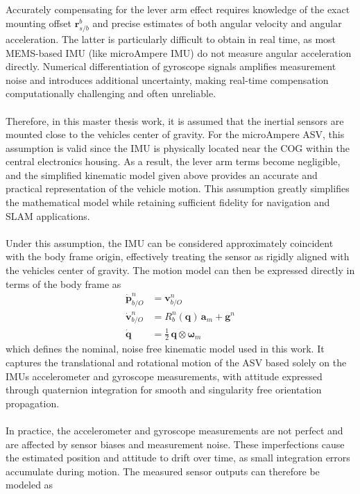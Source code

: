 \\ \\
Accurately compensating for the lever arm effect requires knowledge of the exact mounting offset $\mathbf{r}_{s/b}^{b}$ and precise estimates of both angular velocity and angular acceleration. The latter is particularly difficult to obtain in real time, as most MEMS-based IMU (like microAmpere IMU) do not measure angular acceleration directly. Numerical differentiation of gyroscope signals amplifies measurement noise and introduces additional uncertainty, making real-time compensation computationally challenging and often unreliable.  
\\ \\
Therefore, in this master thesis work, it is assumed that the inertial sensors are mounted close to the vehicles center of gravity. For the microAmpere ASV, this assumption is valid since the IMU is physically located near the COG within the central electronics housing. As a result, the lever arm terms become negligible, and the simplified kinematic model given above provides an accurate and practical representation of the vehicle motion. This assumption greatly simplifies the mathematical model while retaining sufficient fidelity for navigation and SLAM applications.  
\\ \\
Under this assumption, the IMU can be considered approximately coincident with the body frame origin, effectively treating the sensor as rigidly aligned with the vehicles center of gravity. The motion model can then be expressed directly in terms of the body frame as
$$
\begin{aligned}
    \dot{\mathbf{p}}_{b/O}^{n} &= \mathbf{v}_{b/O}^{n} \\
    \dot{\mathbf{v}}_{b/O}^{n} &= R_b^n(\mathbf{q})\,\mathbf{a}_m + \mathbf{g}^n \\
    \dot{\mathbf{q}} &= \tfrac{1}{2}\,\mathbf{q} \otimes \boldsymbol{\omega}_m
\end{aligned}
$$
which defines the nominal, noise free kinematic model used in this work. It captures the translational and rotational motion of the ASV based solely on the IMUs accelerometer and gyroscope measurements, with attitude expressed through quaternion integration for smooth and singularity free orientation propagation.
\\ \\
In practice, the accelerometer and gyroscope measurements are not perfect and are affected by sensor biases and measurement noise. These imperfections cause the estimated position and attitude to drift over time, as small integration errors accumulate during motion. The measured sensor outputs can therefore be modeled as
